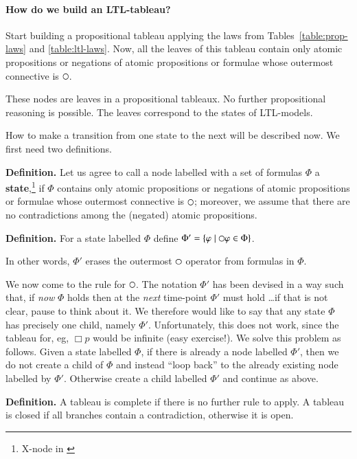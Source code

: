 \paragraph{How do we build an LTL-tableau? }
%
Start building a propositional tableau applying the laws from
Tables~\ref{table:prop-laws} and \ref{table:ltl-laws}.  Now, all the
leaves of this tableau contain only atomic propositions or negations
of atomic propositions or formulae whose outermost connective is
$\next$.

\medskip\noindent These nodes are leaves in a propositional tableaux.
No further propositional reasoning is possible. The leaves correspond
to the states of LTL-models.

\medskip\noindent How to make a transition from one state to the next
will be described now. We first need two definitions.

\medskip\noindent\textbf{Definition. } Let us agree to call a node
labelled with a set of formulas $\Phi$ a
\textbf{state},\footnote{X-node in \cite{benari:logic}} if $\Phi$
contains only atomic propositions or negations of atomic propositions
or formulae whose outermost connective is $\next$; moreover, we assume
that there are no contradictions among the (negated) atomic
propositions.

\medskip\noindent\textbf{Definition. } For a state labelled $\Phi$
define $\Phi'=\{\phi \mid \next\phi\in\Phi\}$.

\medskip\noindent In other words, $\Phi'$ erases the outermost $\next$
operator from formulas in $\Phi$.

\medskip\noindent We now come to the rule for $\next$. The notation
$\Phi'$ has been devised in a way such that, if \emph{now} $\Phi$
holds then at the \emph{next} time-point $\Phi'$ must hold \ldots if
that is not clear, pause to think about it.  We therefore would like
to say that any state $\Phi$ has precisely one child, namely $\Phi'$.
Unfortunately, this does not work, since the tableau for, eg, $\Box p$
would be infinite (easy exercise!).
%
We solve this problem as follows. Given a state labelled $\Phi$, if
there is already a node labelled $\Phi'$, 
then we do not create a child of $\Phi$ and instead ``loop back'' to
the already existing node labelled by $\Phi'$. Otherwise create a child labelled $\Phi'$ and continue as
above.

\medskip\noindent\textbf{Definition. } A tableau is complete if there
is no further rule to apply. A tableau is closed if all branches
contain a contradiction, otherwise it is open.

